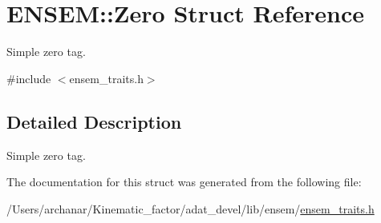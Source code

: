 \hypertarget{structENSEM_1_1Zero}{}\section{E\+N\+S\+EM\+:\+:Zero Struct Reference}
\label{structENSEM_1_1Zero}


Simple zero tag.  




{\ttfamily \#include $<$ensem\+\_\+traits.\+h$>$}



\subsection{Detailed Description}
Simple zero tag. 

The documentation for this struct was generated from the following file\+:\begin{DoxyCompactItemize}
\item 
/\+Users/archanar/\+Kinematic\+\_\+factor/adat\+\_\+devel/lib/ensem/\mbox{\hyperlink{lib_2ensem_2ensem__traits_8h}{ensem\+\_\+traits.\+h}}\end{DoxyCompactItemize}
